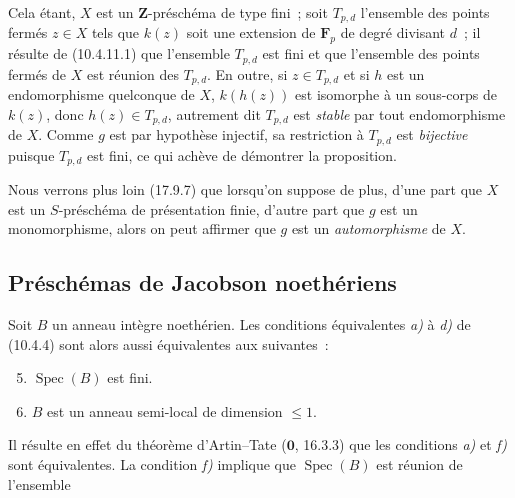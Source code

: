 Cela étant, $X$ est un $\mathbf Z$-préschéma de type fini~; soit $T_{p,d}$
l'ensemble des points fermés $z\in X$ tels que $k(z)$ soit une extension de
$\mathbf F_p$ de degré divisant $d$~; il résulte de (10.4.11.1) que l'ensemble
$T_{p,d}$ est fini et que l'ensemble des points fermés de $X$ est réunion des
$T_{p,d}$. En outre, si $z\in T_{p,d}$ et si $h$ est un endomorphisme
quelconque de $X$, $k(h(z))$ est isomorphe à un sous-corps de $k(z)$, donc
$h(z)\in T_{p,d}$, autrement dit $T_{p,d}$ est \emph{stable} par tout
endomorphisme de $X$. Comme $g$ est par hypothèse injectif, sa restriction à
$T_{p,d}$ est \emph{bijective} puisque $T_{p,d}$ est fini, ce qui achève de
démontrer la proposition.

Nous verrons plus loin (17.9.7) que lorsqu'on suppose de plus, d'une part que
$X$ est un $S$-préschéma de présentation finie, d'autre part que $g$ est un
monomorphisme, alors on peut affirmer que $g$ est un \emph{automorphisme} de
$X$.

\subsection{Préschémas de Jacobson noethériens}
\label{subsection:IV.10.5-fr}

\begin{proposition}[10.5.1]
\label{IV.10.5.1-fr}
Soit $B$ un anneau intègre noethérien. Les conditions équivalentes \emph{a)} à
\emph{d)} de (10.4.4) sont alors aussi équivalentes aux suivantes~:
\begin{enumerate}[label=\emph{\alph*)}]
  \setcounter{enumi}{4}
  \item $\operatorname{Spec}(B)$ est fini.
  \item $B$ est un anneau semi-local de dimension $\leq1$.
\end{enumerate}
\end{proposition}

Il résulte en effet du théorème d'Artin--Tate ($\mathbf 0$, 16.3.3) que les
conditions \emph{a)} et \emph{f)} sont équivalentes. La condition \emph{f)}
implique que $\operatorname{Spec}(B)$ est réunion de l'ensemble

